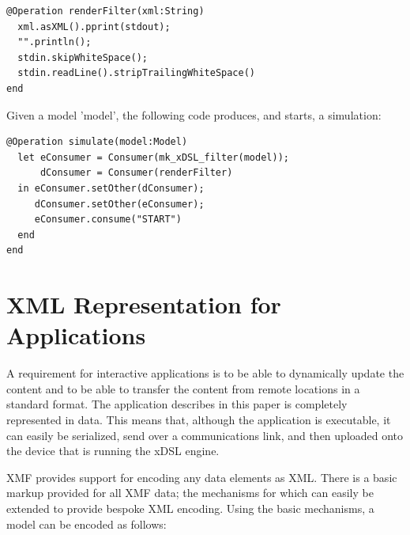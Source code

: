 \begin{lstlisting}
@Operation renderFilter(xml:String)
  xml.asXML().pprint(stdout);
  "".println();
  stdin.skipWhiteSpace();
  stdin.readLine().stripTrailingWhiteSpace()
end 
\end{lstlisting}Given a model 'model', the following code produces, and starts, a
simulation:

\begin{lstlisting}
@Operation simulate(model:Model)
  let eConsumer = Consumer(mk_xDSL_filter(model));
      dConsumer = Consumer(renderFilter)
  in eConsumer.setOther(dConsumer);
     dConsumer.setOther(eConsumer);
     eConsumer.consume("START")
  end
end
\end{lstlisting}
\section{XML Representation for Applications\label{sec:XML-Representation-for}}

A requirement for interactive applications is to be able to dynamically
update the content and to be able to transfer the content from remote
locations in a standard format. The application describes in this
paper is completely represented in data. This means that, although
the application is executable, it can easily be serialized, send over
a communications link, and then uploaded onto the device that is running
the xDSL engine.

XMF provides support for encoding any data elements as XML. There
is a basic markup provided for all XMF data; the mechanisms for which
can easily be extended to provide bespoke XML encoding. Using the
basic mechanisms, a model can be encoded as follows:

